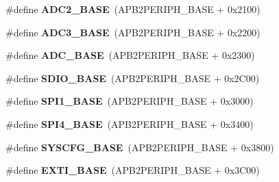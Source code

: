 \begin{DoxyCompactItemize}
\item 
\#define {\bfseries A\+D\+C2\+\_\+\+B\+A\+SE}~(A\+P\+B2\+P\+E\+R\+I\+P\+H\+\_\+\+B\+A\+SE + 0x2100)\hypertarget{group___peripheral__memory__map_ga6544abc57f9759f610eee09a02442ae6}{}\label{group___peripheral__memory__map_ga6544abc57f9759f610eee09a02442ae6}

\item 
\#define {\bfseries A\+D\+C3\+\_\+\+B\+A\+SE}~(A\+P\+B2\+P\+E\+R\+I\+P\+H\+\_\+\+B\+A\+SE + 0x2200)\hypertarget{group___peripheral__memory__map_gaca766f86c8e0b00a8e2b0224dcbb4c82}{}\label{group___peripheral__memory__map_gaca766f86c8e0b00a8e2b0224dcbb4c82}

\item 
\#define {\bfseries A\+D\+C\+\_\+\+B\+A\+SE}~(A\+P\+B2\+P\+E\+R\+I\+P\+H\+\_\+\+B\+A\+SE + 0x2300)\hypertarget{group___peripheral__memory__map_gad06cb9e5985bd216a376f26f22303cd6}{}\label{group___peripheral__memory__map_gad06cb9e5985bd216a376f26f22303cd6}

\item 
\#define {\bfseries S\+D\+I\+O\+\_\+\+B\+A\+SE}~(A\+P\+B2\+P\+E\+R\+I\+P\+H\+\_\+\+B\+A\+SE + 0x2\+C00)\hypertarget{group___peripheral__memory__map_ga95dd0abbc6767893b4b02935fa846f52}{}\label{group___peripheral__memory__map_ga95dd0abbc6767893b4b02935fa846f52}

\item 
\#define {\bfseries S\+P\+I1\+\_\+\+B\+A\+SE}~(A\+P\+B2\+P\+E\+R\+I\+P\+H\+\_\+\+B\+A\+SE + 0x3000)\hypertarget{group___peripheral__memory__map_ga50cd8b47929f18b05efbd0f41253bf8d}{}\label{group___peripheral__memory__map_ga50cd8b47929f18b05efbd0f41253bf8d}

\item 
\#define {\bfseries S\+P\+I4\+\_\+\+B\+A\+SE}~(A\+P\+B2\+P\+E\+R\+I\+P\+H\+\_\+\+B\+A\+SE + 0x3400)\hypertarget{group___peripheral__memory__map_gac5cfaedf263cee1e79554665f921c708}{}\label{group___peripheral__memory__map_gac5cfaedf263cee1e79554665f921c708}

\item 
\#define {\bfseries S\+Y\+S\+C\+F\+G\+\_\+\+B\+A\+SE}~(A\+P\+B2\+P\+E\+R\+I\+P\+H\+\_\+\+B\+A\+SE + 0x3800)\hypertarget{group___peripheral__memory__map_ga62246020bf3b34b6a4d8d0e84ec79d3d}{}\label{group___peripheral__memory__map_ga62246020bf3b34b6a4d8d0e84ec79d3d}

\item 
\#define {\bfseries E\+X\+T\+I\+\_\+\+B\+A\+SE}~(A\+P\+B2\+P\+E\+R\+I\+P\+H\+\_\+\+B\+A\+SE + 0x3\+C00)\hypertarget{group___peripheral__memory__map_ga87371508b3bcdcd98cd1ec629be29061}{}\label{group___peripheral__memory__map_ga87371508b3bcdcd98cd1ec629be29061}


\end{DoxyCompactItemize}

